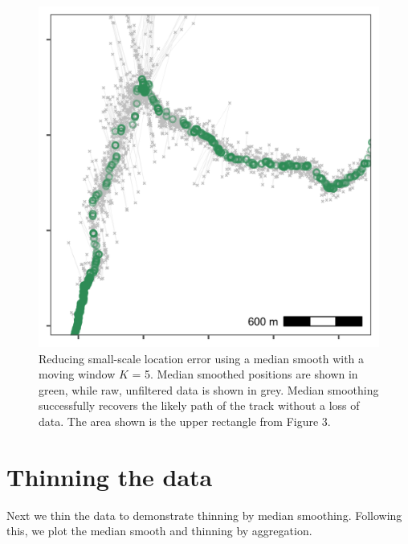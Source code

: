 \documentclass[]{scrreprt}
\begin{document}
\begin{figure}
\centering
\includegraphics{figures/fig_calib_median_smooth.png}
\caption{Reducing small-scale location error using a median smooth with a moving window \(K\) = 5. Median smoothed positions are shown in green, while raw, unfiltered data is shown in grey. Median smoothing successfully recovers the likely path of the track without a loss of data. The area shown is the upper rectangle from Figure 3.}
\end{figure}

\hypertarget{thinning-the-data}{%
\section{Thinning the data}\label{thinning-the-data}}

Next we thin the data to demonstrate thinning by median smoothing.
Following this, we plot the median smooth and thinning by aggregation.
\end{document}
